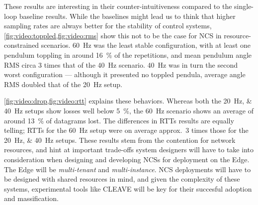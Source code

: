 These results are interesting in their counter-intuitiveness compared to the single-loop baseline results.
While the baselines might lead us to think that higher sampling rates are always better for the stability of control systems, \cref{fig:video:toppled,fig:video:rms} show this not to be the case for \ac{NCS} in resource-constrained scenarios.
\SI{60}{\hertz} was the least stable configuration, with at least one pendulum toppling in around \SI{16}{\percent} of the repetitions, and mean pendulum angle \ac{RMS} circa \num{3} times that of the \SI{40}{\hertz} scenario.
\SI{40}{\hertz} was in turn the second worst configuration --- although it presented no toppled pendula, average angle \ac{RMS} doubled that of the \SI{20}{\hertz} setup.

\cref{fig:video:drop,fig:video:rtt} explains these behaviors.
Whereas both the \SIlist{20;40}{\hertz} setups show losses well below \SI{5}{\percent}, the \SI{60}{\hertz} scenario shows an average of around \SI{13}{\percent} of datagrams lost.
The differences in \acp{RTT} results are equally telling; \acp{RTT} for the \SI{60}{\hertz} setup were on average approx.\ \num{3} times those for the \SIlist{20;40}{\hertz} setups.
These results stem from the contention for network resources, and hint at important trade-offs system designers will have to take into consideration when designing and developing \acp{NCS} for deployment on the Edge.
The Edge will be \emph{multi-tenant} and \emph{multi-instance}. 
\ac{NCS} deployments will have to be designed with shared resources in mind, and given the complexity of these systems, experimental tools like \ac{CLEAVE} will be key for their succesful adoption and massification.
